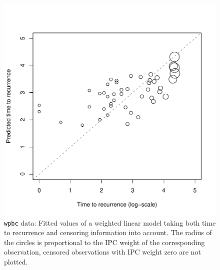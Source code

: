 \documentclass{article}
\newcommand{\Robject}[1]{\texttt{#1}}
\begin{document}
\begin{figure}
\begin{center}
\includegraphics{figures/BH-wpbc-glmboost-censored-fit}
\caption{\Robject{wpbc} data: Fitted values of a weighted linear model taking both time to recurrence and
    censoring information into account. The radius of the circles is proportional to the
    IPC weight of the corresponding observation, censored observations with IPC weight zero
    are not plotted. \label{wpbc-glmboost-censored-fit}}
\end{center}
\end{figure}

\clearpage



\end{document}
